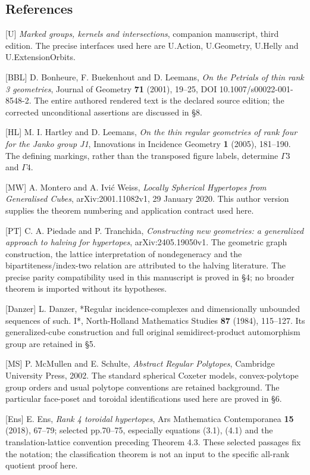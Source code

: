 \documentclass[
  11pt,
  a4paper,
]{article}
\begin{document}
\subsection{References}\label{references}

{[}U{]} \emph{Marked groups, kernels and intersections}, companion
manuscript, third edition. The precise interfaces used here are
U.Action, U.Geometry, U.Helly and U.ExtensionOrbits.

{[}BBL{]} D. Bonheure, F. Buekenhout and D. Leemans, \emph{On the
Petrials of thin rank 3 geometries}, Journal of Geometry \textbf{71}
(2001), 19--25, DOI 10.1007/s00022-001-8548-2. The entire authored
rendered text is the declared source edition; the corrected
unconditional assertions are discussed in §8.

{[}HL{]} M. I. Hartley and D. Leemans, \emph{On the thin regular
geometries of rank four for the Janko group J1}, Innovations in
Incidence Geometry \textbf{1} (2005), 181--190. The defining markings,
rather than the transposed figure labels, determine \(\Gamma 3\) and
\(\Gamma 4\).

{[}MW{]} A. Montero and A. Ivić Weiss, \emph{Locally Spherical
Hypertopes from Generalised Cubes}, arXiv:2001.11082v1, 29 January 2020.
This author version supplies the theorem numbering and application
contract used here.

{[}PT{]} C. A. Piedade and P. Tranchida, \emph{Constructing new
geometries: a generalized approach to halving for hypertopes},
arXiv:2405.19050v1. The geometric graph construction, the lattice
interpretation of nondegeneracy and the bipartiteness/index-two relation
are attributed to the halving literature. The precise parity
compatibility used in this manuscript is proved in §4; no broader
theorem is imported without its hypotheses.

{[}Danzer{]} L. Danzer, *Regular incidence-complexes and dimensionally
unbounded sequences of such. I*, North-Holland Mathematics Studies
\textbf{87} (1984), 115--127. Its generalized-cube construction and full
original semidirect-product automorphism group are retained in §5.

{[}MS{]} P. McMullen and E. Schulte, \emph{Abstract Regular Polytopes},
Cambridge University Press, 2002. The standard spherical Coxeter models,
convex-polytope group orders and usual polytope conventions are retained
background. The particular face-poset and toroidal identifications used
here are proved in §6.

{[}Ens{]} E. Ens, \emph{Rank 4 toroidal hypertopes}, Ars Mathematica
Contemporanea \textbf{15} (2018), 67--79; selected pp.70--75, especially
equations (3.1), (4.1) and the translation-lattice convention preceding
Theorem 4.3. These selected passages fix the notation; the
classification theorem is not an input to the specific all-rank quotient
proof here.
\end{document}
